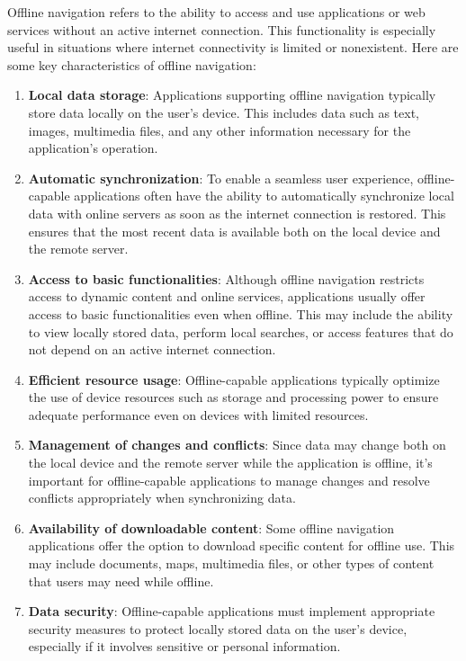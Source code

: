 \documentclass{article}
\begin{document}
\newpage

Offline navigation refers to the ability to access and use applications or web services without an active internet connection. This functionality is especially useful in situations where internet connectivity is limited or nonexistent. Here are some key characteristics of offline navigation:

\begin{enumerate}[label=\arabic*.]
    \item \textbf{Local data storage}: Applications supporting offline navigation typically store data locally on the user's device. This includes data such as text, images, multimedia files, and any other information necessary for the application's operation.
    
    \item \textbf{Automatic synchronization}: To enable a seamless user experience, offline-capable applications often have the ability to automatically synchronize local data with online servers as soon as the internet connection is restored. This ensures that the most recent data is available both on the local device and the remote server.
    
    \item \textbf{Access to basic functionalities}: Although offline navigation restricts access to dynamic content and online services, applications usually offer access to basic functionalities even when offline. This may include the ability to view locally stored data, perform local searches, or access features that do not depend on an active internet connection.
    
    \item \textbf{Efficient resource usage}: Offline-capable applications typically optimize the use of device resources such as storage and processing power to ensure adequate performance even on devices with limited resources.
    
    \item \textbf{Management of changes and conflicts}: Since data may change both on the local device and the remote server while the application is offline, it's important for offline-capable applications to manage changes and resolve conflicts appropriately when synchronizing data.
    
    \item \textbf{Availability of downloadable content}: Some offline navigation applications offer the option to download specific content for offline use. This may include documents, maps, multimedia files, or other types of content that users may need while offline.
    
    \item \textbf{Data security}: Offline-capable applications must implement appropriate security measures to protect locally stored data on the user's device, especially if it involves sensitive or personal information.
\end{enumerate}
\end{document}
